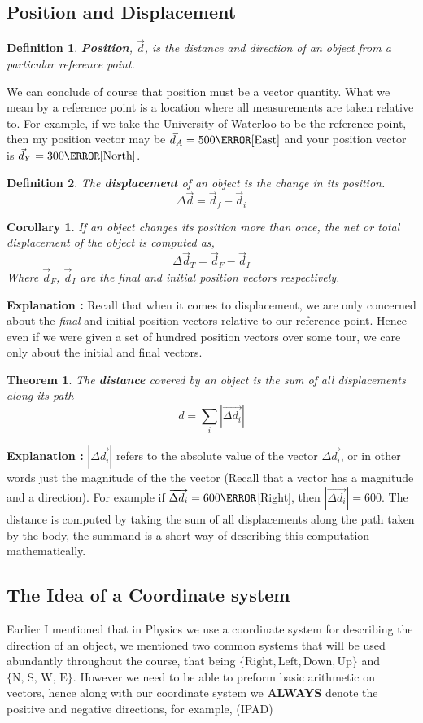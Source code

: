 \documentclass[12pt]{article}
\theoremstyle{break}
\newtheorem{thm}{Theorem}[subsection]
\newtheorem{cor}{Corollary}[thm]
\newtheorem{defn}{Definition}[subsection]
\begin{document}
\subsection{Position and Displacement}
\begin{defn}
\textbf{Position}, $\vec d$, is the distance and direction of an object from a particular \emph{reference point}.
\end{defn}
We can conclude of course that position must be a vector quantity. What we mean by a reference point is a
location where all measurements are taken relative to. For example, if we take the University of Waterloo to be the reference
point, then my position vector may be $\vec d_{A} = 500\km [\text{East}]$ and your position vector is
$\vec d_{Y} = 300\km [\text{North}]$.
\begin{defn}
    The \textbf{displacement} of an object is the change in its position. $$\Delta \vec d = \vec d_{f} - \vec
    d_{i}$$
\end{defn}
\begin{cor}
    If an object changes its position more than once, the \emph{net} or \emph{total}  displacement of the
    object is computed as, $$\Delta \vec d_T = \vec d_F - \vec d_I$$
    Where $\vec d_F$, $\vec d_I$ are the final and initial position vectors respectively.
\end{cor}
\textbf{Explanation : } Recall that when it comes to displacement, we are only concerned about the \emph{final} and {initial} position vectors relative to our reference point. Hence even if we were given a set of hundred position vectors over some tour, we care only about the initial and final vectors.
\vspace*{8cm}
\newpage
\begin{thm}
The \textbf{distance} covered by an object is the sum of all displacements along its path
$$ d = \sum_i |\overrightarrow{\Delta d_i}|$$
\end{thm}
\textbf{Explanation : } $|\overrightarrow{\Delta d_i}|$ refers to the absolute value of the vector $\overrightarrow{\Delta d_i}$, or in other words just the magnitude of the the vector (Recall that a vector has a magnitude and a direction). For example if $\overrightarrow{\Delta d_i} = 600\m$[Right], then $|\overrightarrow{\Delta d_i}| = 600$. The distance is computed by taking the sum of all displacements along the path taken by the body, the summand is a short way of describing this computation mathematically.

\newpage

\subsection{The Idea of a Coordinate system}
Earlier I mentioned that in Physics we use a coordinate system for describing the direction of an object, we
mentioned two common systems that will be used abundantly throughout the course, that being $\{\text{Right},
\text{Left}, \text{Down}, \text{Up} \}$ and $\{\text{N, S, W, E}\}$. However we need to be able to preform
basic arithmetic on vectors, hence along with our coordinate system we \textbf{ALWAYS} denote the positive and
negative directions, for example, (IPAD)
\newpage
\end{document}
